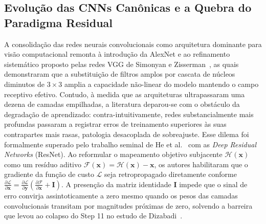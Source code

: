 \documentclass[runningheads]{llncs}
\begin{document}
\subsection{Evolu\c{c}\~{a}o das CNNs Can\^{o}nicas e a Quebra do Paradigma Residual}
A consolida\c{c}\~{a}o das redes neurais convolucionais como arquitetura dominante para vis\~{a}o computacional remonta \`{a} introdu\c{c}\~{a}o da AlexNet e ao refinamento sistem\'{a}tico proposto pelas redes VGG de Simonyan e Zisserman~\cite{simonyan2014very}, as quais demonstraram que a substitui\c{c}\~{a}o de filtros amplos por cascata de n\'{u}cleos diminutos de $3 \times 3$ amplia a capacidade n\~{a}o-linear do modelo mantendo o campo receptivo efetivo. Contudo, \`{a} medida que as arquiteturas ultrapassaram uma dezena de camadas empilhadas, a literatura deparou-se com o obst\'{a}culo da degrada\c{c}\~{a}o de aprendizado: contra-intuitivamente, redes substancialmente mais profundas passaram a registrar erros de treinamento superiores \`{a}s suas contrapartes mais rasas, patologia desacoplada de sobreajuste. Esse dilema foi formalmente superado pelo trabalho seminal de He et al.~\cite{he2016deep} com as \textit{Deep Residual Networks} (ResNet). Ao reformular o mapeamento objetivo subjacente $\mathcal{H}(\mathbf{x})$ como um res\'{i}duo aditivo $\mathcal{F}(\mathbf{x}) = \mathcal{H}(\mathbf{x}) - \mathbf{x}$, os autores habilitaram que o gradiente da fun\c{c}\~{a}o de custo $\mathcal{L}$ seja retropropagado diretamente conforme $\frac{\partial \mathcal{L}}{\partial \mathbf{x}} = \frac{\partial \mathcal{L}}{\partial \mathbf{y}} \left(\frac{\partial \mathcal{F}}{\partial \mathbf{x}} + \mathbf{I}\right)$. A presen\c{c}\~{a}o da matriz identidade $\mathbf{I}$ impede que o sinal de erro convirja assintoticamente a zero mesmo quando os pesos das camadas convolucionais transitam por magnitudes pr\'{o}ximas de zero, solvendo a barreira que levou ao colapso do Step 11 no estudo de Dizabadi~\cite{dizabadi2026empirical}.
\end{document}

